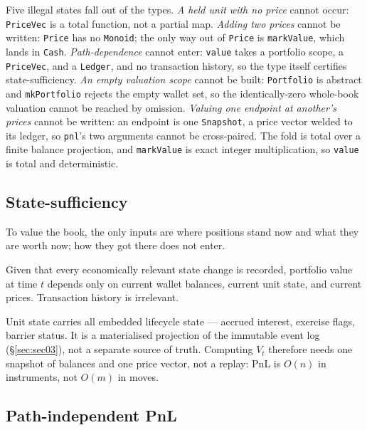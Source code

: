 \noindent Five illegal states fall out of the types. \emph{A held unit with no price} cannot occur: \texttt{PriceVec} is a total function, not a partial map. \emph{Adding two prices} cannot be written: \texttt{Price} has no \texttt{Monoid}; the only way out of \texttt{Price} is \texttt{markValue}, which lands in \texttt{Cash}. \emph{Path-dependence} cannot enter: \texttt{value} takes a portfolio scope, a \texttt{PriceVec}, and a \texttt{Ledger}, and no transaction history, so the type itself certifies state-sufficiency. \emph{An empty valuation scope} cannot be built: \texttt{Portfolio} is abstract and \texttt{mkPortfolio} rejects the empty wallet set, so the identically-zero whole-book valuation cannot be reached by omission. \emph{Valuing one endpoint at another's prices} cannot be written: an endpoint is one \texttt{Snapshot}, a price vector welded to its ledger, so \texttt{pnl}'s two arguments cannot be cross-paired. The fold is total over a finite balance projection, and \texttt{markValue} is exact integer multiplication, so \texttt{value} is total and deterministic.

\subsection{State-sufficiency}

\noindent To value the book, the only inputs are where positions stand now and what they are worth now; how they got there does not enter.

\begin{principle}
\label{prin:state-sufficiency}
Given that every economically relevant state change is recorded, portfolio value at time $t$ depends only on current wallet balances, current unit state, and current prices. Transaction history is irrelevant.
\end{principle}

\noindent Unit state carries all embedded lifecycle state --- accrued interest, exercise flags, barrier status. It is a materialised projection of the immutable event log (\S\ref{sec:sec03}), not a separate source of truth. Computing $V_t$ therefore needs one snapshot of balances and one price vector, not a replay: PnL is $O(n)$ in instruments, not $O(m)$ in moves.

\subsection{Path-independent PnL}

